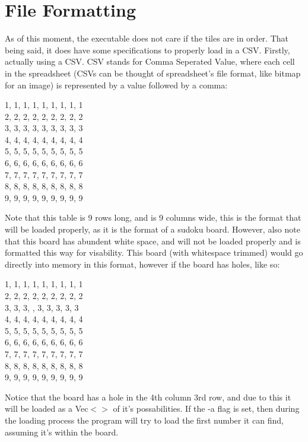 \documentclass[11pt]{article}
\begin{document}
\section{File Formatting}
As of this moment, the executable does not care if the tiles are in order. That being said, it does have some specifications to properly load in a CSV. Firstly, actually using a CSV.
CSV stands for Comma Seperated Value, where each cell in the spreadsheet (CSVs can be thought of spreadsheet's file format, like bitmap for an image) is represented by a value followed by a comma:\\
\begin{center}
  1, 1, 1, 1, 1, 1, 1, 1, 1\\
  2, 2, 2, 2, 2, 2, 2, 2, 2\\
  3, 3, 3, 3, 3, 3, 3, 3, 3\\
  4, 4, 4, 4, 4, 4, 4, 4, 4\\
  5, 5, 5, 5, 5, 5, 5, 5, 5\\
  6, 6, 6, 6, 6, 6, 6, 6, 6\\
  7, 7, 7, 7, 7, 7, 7, 7, 7\\
  8, 8, 8, 8, 8, 8, 8, 8, 8\\
  9, 9, 9, 9, 9, 9, 9, 9, 9\\
\end{center}
Note that this table is 9 rows long, and is 9 columns wide, this is the format that will be loaded properly, as it is the format of a sudoku board. However, also note that this board has 
abundent white space, and will not be loaded properly and is formatted this way for visability. This board (with whitespace trimmed) would go directly into memory in this format, however if the board has holes, like so:\\
\begin{center}
  1, 1, 1, 1, 1, 1, 1, 1, 1\\
  2, 2, 2, 2, 2, 2, 2, 2, 2\\
  3, 3, 3,  , 3, 3, 3, 3, 3\\
  4, 4, 4, 4, 4, 4, 4, 4, 4\\
  5, 5, 5, 5, 5, 5, 5, 5, 5\\
  6, 6, 6, 6, 6, 6, 6, 6, 6\\
  7, 7, 7, 7, 7, 7, 7, 7, 7\\
  8, 8, 8, 8, 8, 8, 8, 8, 8\\
  9, 9, 9, 9, 9, 9, 9, 9, 9\\
\end{center}
Notice that the board has a hole in the 4th column 3rd row, and due to this it will be loaded as a Vec$<>$ of it's possabilities. If the -a flag is set, then 
during the loading process the program will try to load the first number it can find, assuming it's within the board.
\end{document}

